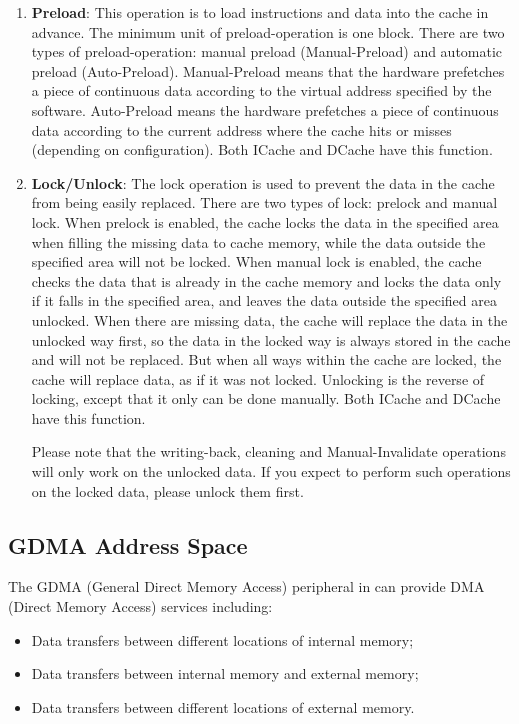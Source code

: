 \documentclass[main\_\_EN.tex]{subfiles}
\begin{document}
\begin{enumerate}
\item \textbf{Preload}: This operation is to load instructions and data into the cache in advance. The minimum unit of preload-operation is one block. There are two types of preload-operation: manual preload (Manual-Preload) and automatic preload (Auto-Preload). Manual-Preload means that the hardware prefetches a piece of continuous data according to the virtual address specified by the software. Auto-Preload means the hardware prefetches a piece of continuous data according to the current address where the cache hits or misses (depending on configuration). Both ICache and DCache have this function.

\item \textbf{Lock/Unlock}: The lock operation is used to prevent the data in the cache from being easily replaced. There are two types of lock: prelock and manual lock. When prelock is enabled, the cache locks the data in the specified area when filling the missing data to cache memory, while the data outside the specified area will not be locked. When manual lock is enabled, the cache checks the data that is already in the cache memory and locks the data only if it falls in the specified area, and leaves the data outside the specified area unlocked. When there are missing data, the cache will replace the data in the unlocked way first, so the data in the locked way is always stored in the cache and will not be replaced. But when all ways within the cache are locked, the cache will replace data, as if it was not locked. Unlocking is the reverse of locking, except that it only can be done manually. Both ICache and DCache have this function.

Please note that the writing-back, cleaning and Manual-Invalidate operations will only work on the unlocked data. If you expect to perform such operations on the locked data, please unlock them first.
\end{enumerate}




\subsection{GDMA Address Space}

The GDMA (General Direct Memory Access) peripheral in \chipname{} can provide DMA (Direct Memory Access) services including:

\begin{itemize}
\item Data transfers between different locations of internal memory;
\item Data transfers between internal memory and external memory;
\item Data transfers between different locations of external memory.
\end{itemize}
\end{document}
